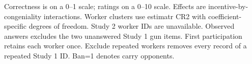 \noindent\footnotesize Correctness is on a 0--1 scale; ratings on a 0--10 scale. Effects are incentive-by-congeniality interactions. Worker clusters use estimatr CR2 with coefficient-specific degrees of freedom. Study 2 worker IDs are unavailable. Observed answers excludes the two unanswered Study 1 gun items. First participation retains each worker once. Exclude repeated workers removes every record of a repeated Study 1 ID. Ban=1 denotes carry opponents.\par\normalsize
